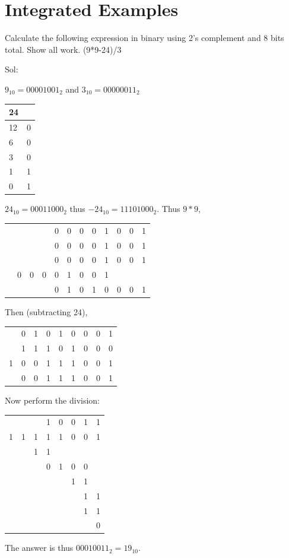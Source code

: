 \section{Integrated Examples}







\begin{example}
Calculate the following expression in binary using 2's
complement and 8 bits total.  Show all work.
\beqn
(9*9-24)/3
\eeqn
{\color{ans}
Sol:

$9_{10}=00001001_{2}$ and $3_{10}=00000011_{2}$

\begin{tabular}{l|l}
24 & \\
\hline
12 & 0 \\
6 & 0 \\
3 & 0 \\
1 & 1 \\
0 & 1 \\
\end{tabular}

$24_{10}=00011000_{2}$ thus $-24_{10}=11101000_{2}$.
Thus $9*9$,

\begin{tabular}{cccccccccccc}
&&&&0&0&0&0&1&0&0&1 \\
&&&&0&0&0&0&1&0&0&1 \\
\hline
&&&&0&0&0&0&1&0&0&1 \\
&0&0&0&0&1&0&0&1&&& \\
\hline
&&&&0&1&0&1&0&0&0&1 \\
\end{tabular}

Then (subtracting 24),

\begin{tabular}{ccccccccc}
&0&1&0&1&0&0&0&1 \\
&1&1&1&0&1&0&0&0 \\
\hline
1&0&0&1&1&1&0&0&1 \\
&0&0&1&1&1&0&0&1 \\
\end{tabular}

Now perform the division:

\begin{tabular}{cccccccc}
&&&1&0&0&1&1 \\ \cline{3-8}
1 & 1 & \multicolumn{1}{|c}{1} & 1 & 1 & 0 & 0 & 1 \\
  &   & 1 & 1 &   &   &   & \\ \cline{3-4}
  &   &   & 0 & 1 & 0 & 0 & \\
  &   &   &   &   & 1 & 1 & \\ \cline{6-7}
  &   &   &   &   &   & 1 & 1 \\
  &   &   &   &   &   & 1 & 1 \\ \cline{7-8}
  &   &   &   &   &   &   & 0 \\
\end{tabular}

The answer is thus $00010011_{2} = 19_{10}$.
}
\end{example}




